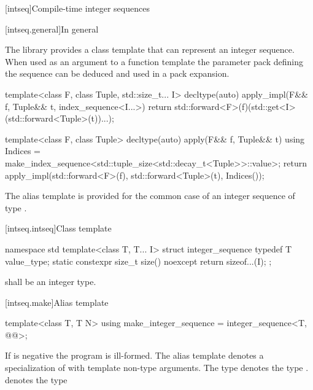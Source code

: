 [intseq]{Compile-time integer sequences}

[intseq.general]{In general}

\pnum
The library provides a class template that can represent an integer sequence.
When used as an argument to a function template the parameter pack defining the
sequence can be deduced and used in a pack expansion.

\pnum
\enterexample

\begin{codeblock}
template<class F, class Tuple, std::size_t... I>
  decltype(auto) apply_impl(F&& f, Tuple&& t, index_sequence<I...>) {
    return std::forward<F>(f)(std::get<I>(std::forward<Tuple>(t))...);
  }

template<class F, class Tuple>
  decltype(auto) apply(F&& f, Tuple&& t) {
    using Indices = make_index_sequence<std::tuple_size<std::decay_t<Tuple>>::value>;
    return apply_impl(std::forward<F>(f), std::forward<Tuple>(t), Indices());
  }
\end{codeblock}

\exitexample
\enternote
The  alias template is provided for the common case of
an integer sequence of type .
\exitnote

[intseq.intseq]{Class template }

%
\begin{codeblock}
namespace std {
  template<class T, T... I>
  struct integer_sequence {
    typedef T value_type;
    static constexpr size_t size() noexcept { return sizeof...(I); }
  };
}
\end{codeblock}

\pnum
{} shall be an integer type.

[intseq.make]{Alias template }

%
\begin{itemdecl}
template<class T, T N>
  using make_integer_sequence = integer_sequence<T, @\seebelow{}@>;
\end{itemdecl}

\begin{itemdescr}
\pnum
If  is negative the program is ill-formed. The alias template
 denotes a specialization of
 with  template non-type arguments.
The type  denotes the type
.
\enternote {} denotes the type
 \exitnote
\end{itemdescr}

